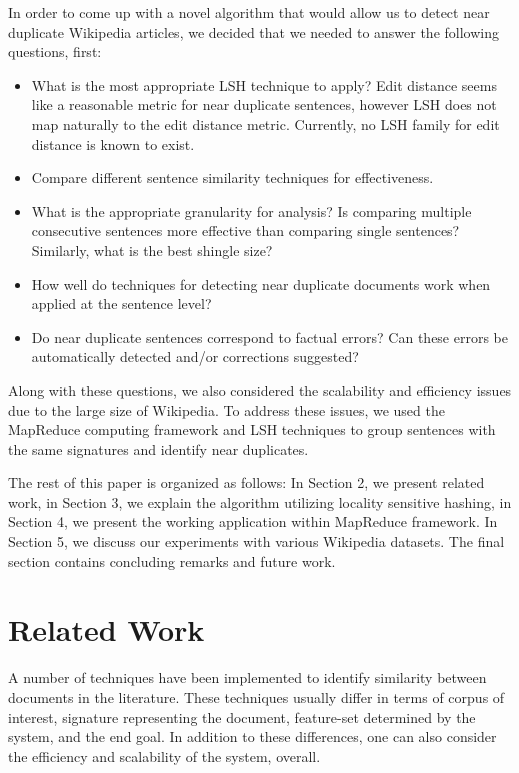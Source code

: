 \documentclass{acm_proc_article-sp}
\begin{document}
In order to come up with a novel algorithm that would allow us to detect near duplicate Wikipedia articles, we decided that we needed to answer the following questions, first:
\begin{itemize}
\item What is the most appropriate LSH technique to apply? Edit distance seems like a reasonable metric for near duplicate sentences, however LSH does not map naturally to the edit distance metric. Currently, no LSH family for edit distance is known to exist.
\item Compare different sentence similarity techniques for effectiveness. 
\item What is the appropriate granularity for analysis? Is comparing multiple consecutive sentences more effective than comparing single sentences? Similarly, what is the best shingle size?
\item How well do techniques for detecting near duplicate documents work when applied at the sentence level?
\item Do near duplicate sentences correspond to factual errors? Can these errors be automatically detected and/or corrections suggested?
\end{itemize}

Along with these questions, we also considered the scalability and efficiency issues due to the large size of Wikipedia. To address these issues, we used the MapReduce computing framework and LSH techniques to group sentences with the same signatures and identify near duplicates.

The rest of this paper is organized as follows: In Section 2, we present related work, in Section 3, we explain the algorithm utilizing locality sensitive hashing, in Section 4, we present the working application within MapReduce framework. In Section 5, we discuss our experiments with various Wikipedia datasets. The final section contains concluding remarks and future work.

\section{Related Work}
A number of techniques have been implemented to identify similarity between documents in the literature. These techniques usually differ in terms of corpus of interest, signature representing the document, feature-set determined by the system, and the end goal. In addition to these differences, one can also consider the efficiency and scalability of the system, overall. 
\end{document}
